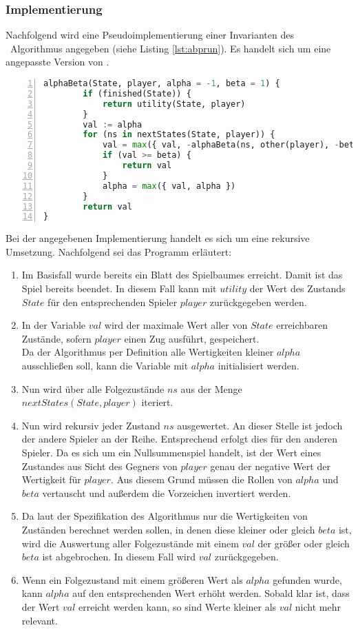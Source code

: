 \subsubsection{Implementierung}
\label{ab-basics-impl}
Nachfolgend wird eine Pseudoimplementierung einer Invarianten des \abab\ Algorithmus angegeben (siehe Listing \ref{lst:abprun}). Es handelt sich um eine angepasste Version von \cite{StroetmannAI19}.
\begin{lstlisting}[caption = {Pseudoimplementierung von \abab}, language = python, captionpos = t , numbers=left, label={lst:abprun}]
alphaBeta(State, player, alpha = -1, beta = 1) {
        if (finished(State)) {
            return utility(State, player)
        }
        val := alpha
        for (ns in nextStates(State, player)) {
            val = max({ val, -alphaBeta(ns, other(player), -beta, -alpha) })
            if (val >= beta) {
                return val
            }
            alpha = max({ val, alpha })
        }
        return val
}
\end{lstlisting}
Bei der angegebenen Implementierung handelt es sich um eine rekursive Umsetzung. Nachfolgend sei das Programm erläutert:
\begin{enumerate}
\item Im Basisfall wurde bereits ein Blatt des Spielbaumes erreicht. Damit ist das Spiel bereits beendet. In diesem Fall kann mit $utility$ der Wert des Zustands $State$ für den entsprechenden Spieler $player$ zurückgegeben werden.
\item In der Variable $val$ wird der maximale Wert aller von $State$ erreichbaren Zustände, sofern $player$ einen Zug ausführt, gespeichert.\\
Da der Algorithmus per Definition alle Wertigkeiten kleiner $alpha$ ausschließen soll, kann die Variable mit $alpha$ initialisiert werden.
\item Nun wird über alle Folgezustände $ns$ aus der Menge $nextStates(State, player)$ iteriert.
\item Nun wird rekursiv jeder Zustand $ns$ ausgewertet. An dieser Stelle ist jedoch der andere Spieler an der Reihe. Entsprechend erfolgt dies für den anderen Spieler. Da es sich um ein Nullsummenspiel handelt, ist der Wert eines Zustandes aus Sicht des Gegners von $player$ genau der negative Wert der Wertigkeit für $player$. Aus diesem Grund müssen die Rollen von $alpha$ und $beta$ vertauscht und außerdem die Vorzeichen invertiert werden.
\item Da laut der Spezifikation des Algorithmus nur die Wertigkeiten von Zuständen berechnet werden sollen, in denen diese kleiner oder gleich $beta$ ist, wird die Auswertung aller Folgezustände mit einem $val$ der größer oder gleich $beta$ ist abgebrochen. In diesem Fall wird $val$ zurückgegeben.
\item Wenn ein Folgezustand mit einem größeren Wert als $alpha$ gefunden wurde, kann $alpha$ auf den entsprechenden Wert erhöht werden. Sobald klar ist, dass der Wert $val$ erreicht werden kann, so sind Werte kleiner als $val$ nicht mehr relevant.  
 
\end{enumerate}

